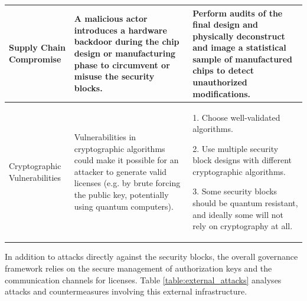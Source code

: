 \documentclass{article}
\begin{document}
\begin{longtable}{p{3cm}|p{5.5cm}|p{6.5cm}}
\midrule
Supply Chain Compromise & A malicious actor introduces a hardware backdoor during the chip design or manufacturing phase to circumvent or misuse the security blocks. & Perform audits of the final design and physically deconstruct and image a statistical sample of manufactured chips to detect unauthorized modifications. \\
\midrule
Cryptographic Vulnerabilities & Vulnerabilities in cryptographic algorithms could make it possible for an attacker to generate valid licenses (e.g. by brute forcing the public key, potentially using quantum computers). & 1. Choose well-validated algorithms.\par 2. Use multiple security block designs with different cryptographic algorithms. \par 3. Some security blocks should be quantum resistant, and ideally some will not rely on cryptography at all. \\
\end{longtable}

In addition to attacks directly against the security blocks, the overall governance framework relies on the secure management of authorization keys and the communication channels for licenses. Table \ref{table:external_attacks} analyses attacks and countermeasures involving this external infrastructure. 
\end{document}
